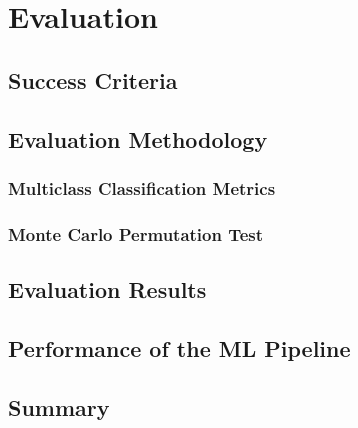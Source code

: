 

    \chapter{Evaluation}
    
    \section{Success Criteria}
    
    \section{Evaluation Methodology}
    
    \subsection{Multiclass Classification Metrics}
    
    \subsection{Monte Carlo Permutation Test}
    
    \section{Evaluation Results}
    
    \section{Performance of the ML Pipeline}
    
    \section{Summary}
    
